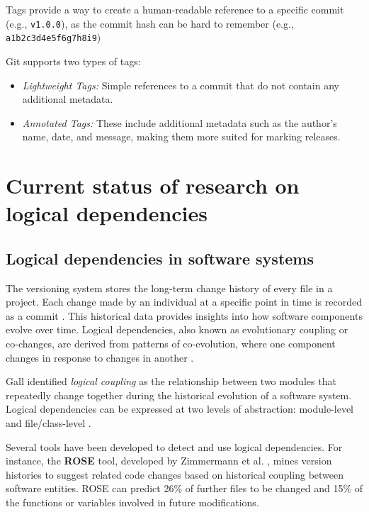 Tags provide a way to create a human-readable reference to a specific commit (e.g., \texttt{v1.0.0}), as the commit hash can be hard to remember (e.g., \texttt{a1b2c3d4e5f6g7h8i9})

Git supports two types of tags:
\begin{itemize}
    \item \textit{Lightweight Tags:} Simple references to a commit that do not contain any additional metadata.
    \item \textit{Annotated Tags:} These include additional metadata such as the author's name, date, and message, making them more suited for marking releases.
\end{itemize}



\section{Current status of research on logical dependencies}
\label{ld-intro}

\subsection{Logical dependencies in software systems}

\hspace{4em}The versioning system stores the long-term change history of every file in a project. Each change made by an individual at a specific point in time is recorded as a commit \cite{7471284}. This historical data provides insights into how software components evolve over time. Logical dependencies, also known as evolutionary coupling or co-changes, are derived from patterns of co-evolution, where one component changes in response to changes in another \cite{Yu:2007:UCC:1231330.1231370, Beck:2011:CMC:2025113.2025162}.

Gall \cite{Gall:1998:DLC:850947.853338, Gall:2003:CRH:942803.943741, 6606615} identified \textit{logical coupling} as the relationship between two modules that repeatedly change together during the historical evolution of a software system. Logical dependencies can be expressed at two levels of abstraction: module-level \cite{LD-module-new} and file/class-level \cite{Gall:2003:CRH:942803.943741, inproceedings-gall}.

Several tools have been developed to detect and use logical dependencies. For instance, the \textbf{ROSE} tool, developed by Zimmermann et al. \cite{Zimmermann:2004:MVH:998675.999460}, mines version histories to suggest related code changes based on historical coupling between software entities. ROSE can predict 26\% of further files to be changed and 15\% of the functions or variables involved in future modifications.

